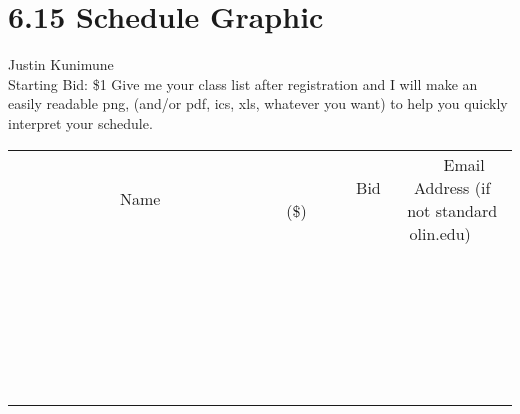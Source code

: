 \documentclass[11pt]{article}
\begin{document}
\section*{6.15 Schedule Graphic}
Justin Kunimune
\\
Starting Bid: \$1
\newline
Give me your class list after registration and I will make an easily readable png, (and/or pdf, ics, xls, whatever you want) to help you quickly interpret your schedule.
\\[6ex]
\begin{tabular}{c c c}
~~~~~~~~~~~~~Name~~~~~~~~~~~~~ & ~~~~~~~~~Bid (\$)~~~~~~~~~  & ~~~Email Address (if not standard olin.edu)~~~\\
 & & \\
\hline
 & & \\
\hline
 & & \\
\hline
 & & \\
\hline
 & & \\
\hline
 & & \\
\hline
 & & \\
\hline
 & & \\
\hline
 & & \\
\hline
 & & \\
\hline
 & & \\
\hline
 & & \\
\hline
 & & \\
\hline
 & & \\
\hline
 & & \\
\hline
 & & \\
\hline
 & & \\
\hline
 & & \\
\hline
 & & \\
\hline
 & & \\
\hline
 & & \\
\hline
 & & \\
\hline
 & & \\
\hline
 & & \\
\hline
 & & \\
\hline
 & & \\
\hline
\end{tabular}
\newpage
\end{document}
